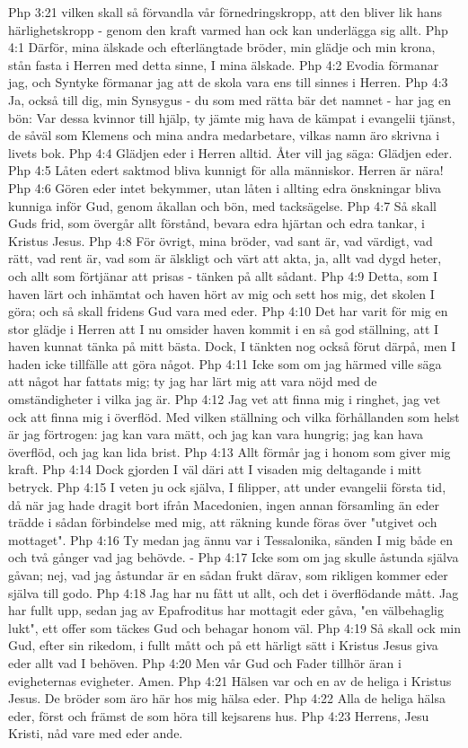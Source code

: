 Php 3:21  vilken skall så förvandla vår förnedringskropp, att den bliver lik hans härlighetskropp - genom den kraft varmed han ock kan underlägga sig allt.
Php 4:1  Därför, mina älskade och efterlängtade bröder, min glädje och min krona, stån fasta i Herren med detta sinne, I mina älskade.
Php 4:2  Evodia förmanar jag, och Syntyke förmanar jag att de skola vara ens till sinnes i Herren.
Php 4:3  Ja, också till dig, min Synsygus - du som med rätta bär det namnet - har jag en bön: Var dessa kvinnor till hjälp, ty jämte mig hava de kämpat i evangelii tjänst, de såväl som Klemens och mina andra medarbetare, vilkas namn äro skrivna i livets bok.
Php 4:4  Glädjen eder i Herren alltid. Åter vill jag säga: Glädjen eder.
Php 4:5  Låten edert saktmod bliva kunnigt för alla människor. Herren är nära!
Php 4:6  Gören eder intet bekymmer, utan låten i allting edra önskningar bliva kunniga inför Gud, genom åkallan och bön, med tacksägelse.
Php 4:7  Så skall Guds frid, som övergår allt förstånd, bevara edra hjärtan och edra tankar, i Kristus Jesus.
Php 4:8  För övrigt, mina bröder, vad sant är, vad värdigt, vad rätt, vad rent är, vad som är älskligt och värt att akta, ja, allt vad dygd heter, och allt som förtjänar att prisas - tänken på allt sådant.
Php 4:9  Detta, som I haven lärt och inhämtat och haven hört av mig och sett hos mig, det skolen I göra; och så skall fridens Gud vara med eder.
Php 4:10  Det har varit för mig en stor glädje i Herren att I nu omsider haven kommit i en så god ställning, att I haven kunnat tänka på mitt bästa. Dock, I tänkten nog också förut därpå, men I haden icke tillfälle att göra något.
Php 4:11  Icke som om jag härmed ville säga att något har fattats mig; ty jag har lärt mig att vara nöjd med de omständigheter i vilka jag är.
Php 4:12  Jag vet att finna mig i ringhet, jag vet ock att finna mig i överflöd. Med vilken ställning och vilka förhållanden som helst är jag förtrogen: jag kan vara mätt, och jag kan vara hungrig; jag kan hava överflöd, och jag kan lida brist.
Php 4:13  Allt förmår jag i honom som giver mig kraft.
Php 4:14  Dock gjorden I väl däri att I visaden mig deltagande i mitt betryck.
Php 4:15  I veten ju ock själva, I filipper, att under evangelii första tid, då när jag hade dragit bort ifrån Macedonien, ingen annan församling än eder trädde i sådan förbindelse med mig, att räkning kunde föras över "utgivet och mottaget".
Php 4:16  Ty medan jag ännu var i Tessalonika, sänden I mig både en och två gånger vad jag behövde. -
Php 4:17  Icke som om jag skulle åstunda själva gåvan; nej, vad jag åstundar är en sådan frukt därav, som rikligen kommer eder själva till godo.
Php 4:18  Jag har nu fått ut allt, och det i överflödande mått. Jag har fullt upp, sedan jag av Epafroditus har mottagit eder gåva, "en välbehaglig lukt", ett offer som täckes Gud och behagar honom väl.
Php 4:19  Så skall ock min Gud, efter sin rikedom, i fullt mått och på ett härligt sätt i Kristus Jesus giva eder allt vad I behöven.
Php 4:20  Men vår Gud och Fader tillhör äran i evigheternas evigheter. Amen.
Php 4:21  Hälsen var och en av de heliga i Kristus Jesus. De bröder som äro här hos mig hälsa eder.
Php 4:22  Alla de heliga hälsa eder, först och främst de som höra till kejsarens hus.
Php 4:23  Herrens, Jesu Kristi, nåd vare med eder ande.


